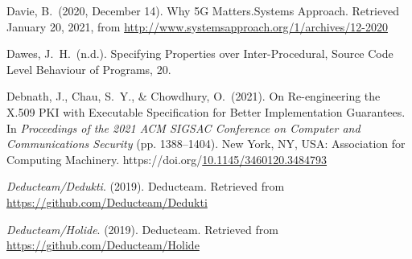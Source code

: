 \documentclass[12pt,twoside]{article}
\begin{document}
{\begin{thebibliography}{1079}
\mdbibitemlabel{}Davie, B.~(2020, December 14). Why 5G Matters.Systems Approach. Retrieved January 20, 2021, from \href{http://www.systemsapproach.org/1/archives/12-2020}{{\ttfamily http://\hspace{0pt}www.\hspace{0pt}systemsapproach.\hspace{0pt}org/\hspace{0pt}1/\hspace{0pt}archives/\hspace{0pt}12-\hspace{0pt}2020}}%

\mdbibitemlabel{}Dawes, J.~H.~(n.d.). Specifying Properties over Inter-Procedural, Source Code Level Behaviour of Programs, 20.%

\mdbibitemlabel{}Debnath, J., Chau, S.~Y., \& Chowdhury, O.~(2021). On Re-engineering the X.509 PKI with Executable Specification for Better Implementation Guarantees. In \emph{Proceedings of the 2021 ACM SIGSAC Conference on Computer and Communications Security} (pp. 1388–1404). New York, NY, USA: Association for Computing Machinery. https://doi.org/\href{https://dx.doi.org/10.1145/3460120.3484793}{10.1145/3460120.3484793}%

\mdbibitemlabel{}\emph{Deducteam/Dedukti}. (2019). Deducteam. Retrieved from \href{https://github.com/Deducteam/Dedukti}{{\ttfamily https://\hspace{0pt}github.\hspace{0pt}com/\hspace{0pt}Deducteam/\hspace{0pt}Dedukti}}%

\mdbibitemlabel{}\emph{Deducteam/Holide}. (2019). Deducteam. Retrieved from \href{https://github.com/Deducteam/Holide}{{\ttfamily https://\hspace{0pt}github.\hspace{0pt}com/\hspace{0pt}Deducteam/\hspace{0pt}Holide}}%


\end{thebibliography}}
\end{document}

